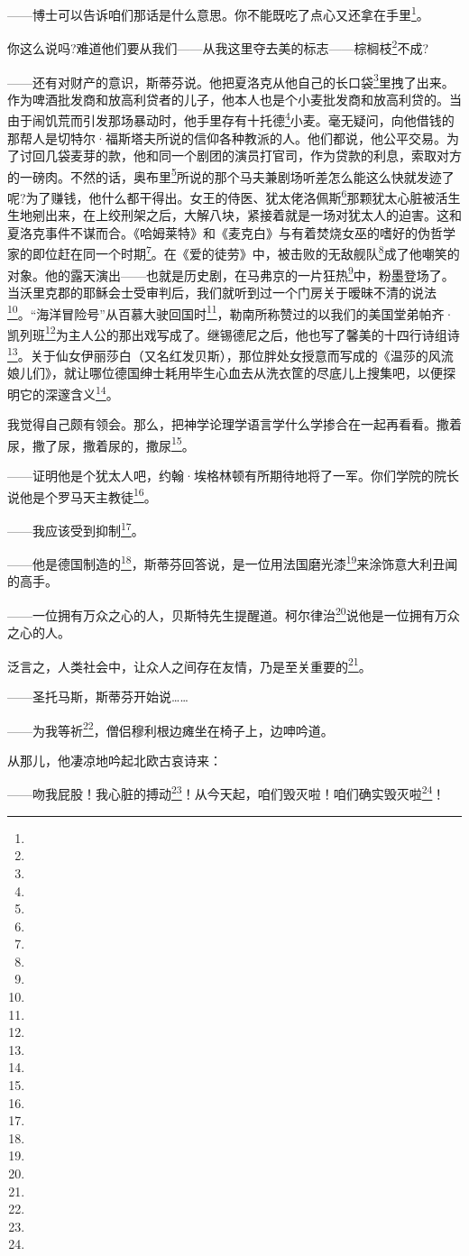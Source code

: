 \par ——博士可以告诉咱们那话是什么意思。你不能既吃了点心又还拿在手里\footnote{}。
\par 你这么说吗?难道他们要从我们——从我这里夺去美的标志——棕榈枝\footnote{}不成?
\par ——还有对财产的意识，斯蒂芬说。他把夏洛克从他自己的长口袋\footnote{}里拽了出来。作为啤酒批发商和放高利贷者的儿子，他本人也是个小麦批发商和放高利贷的。当由于闹饥荒而引发那场暴动时，他手里存有十托德\footnote{}小麦。毫无疑问，向他借钱的那帮人是切特尔·福斯塔夫所说的信仰各种教派的人。他们都说，他公平交易。为了讨回几袋麦芽的款，他和同一个剧团的演员打官司，作为贷款的利息，索取对方的一磅肉。不然的话，奥布里\footnote{}所说的那个马夫兼剧场听差怎么能这么快就发迹了呢?为了赚钱，他什么都干得出。女王的侍医、犹太佬洛佩斯\footnote{}那颗犹太心脏被活生生地剜出来，在上绞刑架之后，大解八块，紧接着就是一场对犹太人的迫害。这和夏洛克事件不谋而合。《哈姆莱特》和《麦克白》与有着焚烧女巫的嗜好的伪哲学家的即位赶在同一个时期\footnote{}。在《爱的徒劳》中，被击败的无敌舰队\footnote{}成了他嘲笑的对象。他的露天演出——也就是历史剧，在马弗京的一片狂热\footnote{}中，粉墨登场了。当沃里克郡的耶稣会士受审判后，我们就听到过一个门房关于暧昧不清的说法\footnote{}。“海洋冒险号”从百慕大驶回国时\footnote{}，勒南所称赞过的以我们的美国堂弟帕齐·凯列班\footnote{}为主人公的那出戏写成了。继锡德尼之后，他也写了馨美的十四行诗组诗\footnote{}。关于仙女伊丽莎白（又名红发贝斯），那位胖处女授意而写成的《温莎的风流娘儿们》，就让哪位德国绅士耗用毕生心血去从洗衣筐的尽底儿上搜集吧，以便探明它的深邃含义\footnote{}。
\par 我觉得自己颇有领会。那么，把神学论理学语言学什么学掺合在一起再看看。撒着尿，撒了尿，撒着尿的，撒尿\footnote{}。
\par ——证明他是个犹太人吧，约翰·埃格林顿有所期待地将了一军。你们学院的院长说他是个罗马天主教徒\footnote{}。
\par ——我应该受到抑制\footnote{}。
\par ——他是德国制造的\footnote{}，斯蒂芬回答说，是一位用法国磨光漆\footnote{}来涂饰意大利丑闻的高手。
\par ——一位拥有万众之心的人，贝斯特先生提醒道。柯尔律治\footnote{}说他是一位拥有万众之心的人。
\par 泛言之，人类社会中，让众人之间存在友情，乃是至关重要的\footnote{}。
\par ——圣托马斯，斯蒂芬开始说……
\par ——为我等祈\footnote{}，僧侣穆利根边瘫坐在椅子上，边呻吟道。
\par 从那儿，他凄凉地吟起北欧古哀诗来：
\par ——吻我屁股！我心脏的搏动\footnote{}！从今天起，咱们毁灭啦！咱们确实毁灭啦\footnote{}！
